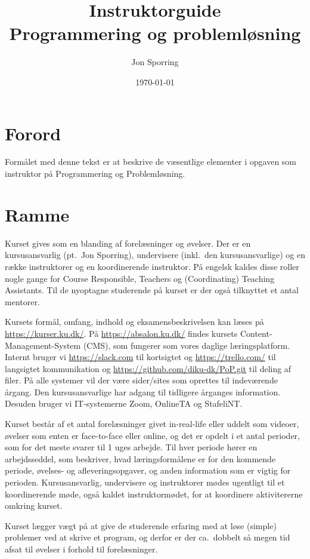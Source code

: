 \documentclass[a4paper]{article}
\title{Instruktorguide\\Programmering og problemløsning}
\author{Jon Sporring}
\date{\today}
\begin{document}
\maketitle

\section{Forord}
Formålet med denne tekst er at beskrive de væsentlige elementer i
opgaven som instruktor på Programmering og Problemløsning.

\section{Ramme}
Kurset gives som en blanding af forelæsninger og øvelser. Der er en
kursusansvarlig (pt.\ Jon Sporring), undervisere (inkl.\ den
kursusansvarlige) og en række instruktorer og en koordinerende
instruktor. På engelsk kaldes disse roller nogle gange for Course
Responsible, Teachers og (Coordinating) Teaching Assistants. Til de
nyoptagne studerende på kurset er der også tilknyttet et antal
mentorer.

Kursets formål, omfang, indhold og eksamensbeskrivelsen kan læses på
\url{https://kurser.ku.dk/}. På \url{https://absalon.ku.dk/} findes
kursets Content-Management-System (CMS), som fungerer som vores
daglige læringsplatform. Internt bruger vi \url{https://slack.com} til
kortsigtet og \url{https://trello.com/} til langsigtet kommunikation
og \url{https://github.com/diku-dk/PoP.git} til deling af filer. På
alle systemer vil der være sider/sites som oprettes til indeværende
årgang. Den kursusansvarlige har adgang til tidligere årganges
information. Desuden bruger vi IT-systemerne Zoom, OnlineTA og
StafeliNT.

Kurset består af et antal forelæsninger givet in-real-life eller
uddelt som videoer, øvelser som enten er face-to-face eller online, og
det er opdelt i et antal perioder, som for det meste svarer til 1 uges
arbejde. Til hver periode hører en arbejdsseddel, som beskriver, hvad
læringsformålene er for den kommende periode, øvelses- og
afleveringsopgaver, og anden information som er vigtig for
perioden. Kursusansvarlig, undervisere og instruktorer mødes ugentligt
til et koordinerende møde, også kaldet instruktormødet, for at
koordinere aktivitererne omkring kurset.

Kurset lægger vægt på at give de studerende erfaring med at løse
(simple) problemer ved at skrive et program, og derfor er der
ca.\ dobbelt så megen tid afsat til øvelser i forhold til
forelæsninger.
\end{document}
